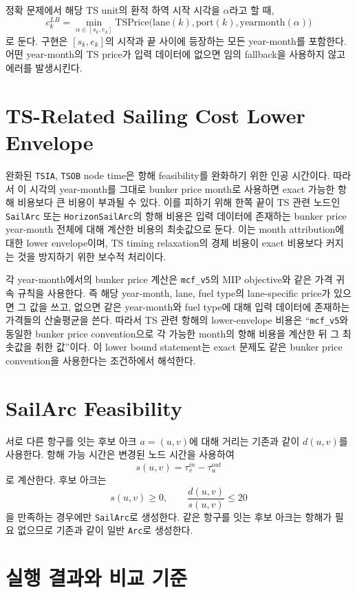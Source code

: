 \documentclass[11pt]{article}
\begin{document}
정확 문제에서 해당 TS unit의 환적 하역 시작 시각을 $\alpha$라고 할 때,
\[
  c^{LB}_k
  =
  \min_{\alpha\in [s_k,e_k]}
  \mathrm{TSPrice}\bigl(\mathrm{lane}(k),\mathrm{port}(k),
  \mathrm{yearmonth}(\alpha)\bigr)
\]
로 둔다. 구현은 $[s_k,e_k]$의 시작과 끝 사이에 등장하는 모든 year-month를 포함한다.
어떤 year-month의 TS price가 입력 데이터에 없으면 임의 fallback을 사용하지 않고
에러를 발생시킨다.

\section{TS-Related Sailing Cost Lower Envelope}

완화된 \texttt{TSIA}, \texttt{TSOB} node time은 항해 feasibility를 완화하기 위한
인공 시간이다. 따라서 이 시각의 year-month를 그대로 bunker price month로 사용하면
exact 가능한 항해 비용보다 큰 비용이 부과될 수 있다. 이를 피하기 위해 한쪽 끝이
TS 관련 노드인 \texttt{SailArc} 또는 \texttt{HorizonSailArc}의 항해 비용은 입력
데이터에 존재하는 bunker price year-month 전체에 대해 계산한 비용의 최솟값으로
둔다. 이는 month attribution에 대한 lower envelope이며, TS timing relaxation의
경제 비용이 exact 비용보다 커지는 것을 방지하기 위한 보수적 처리이다.

각 year-month에서의 bunker price 계산은 \texttt{mcf\_v5}의 MIP objective와 같은
가격 귀속 규칙을 사용한다. 즉 해당 year-month, lane, fuel type의 lane-specific
price가 있으면 그 값을 쓰고, 없으면 같은 year-month와 fuel type에 대해 입력 데이터에
존재하는 가격들의 산술평균을 쓴다. 따라서 TS 관련 항해의 lower-envelope 비용은
``\texttt{mcf\_v5}와 동일한 bunker price convention으로 각 가능한 month의 항해
비용을 계산한 뒤 그 최솟값을 취한 값''이다. 이 lower bound statement는 exact 문제도
같은 bunker price convention을 사용한다는 조건하에서 해석한다.

\section{SailArc Feasibility}

서로 다른 항구를 잇는 후보 아크 $a=(u,v)$에 대해 거리는 기존과 같이
$d(u,v)$를 사용한다. 항해 가능 시간은 변경된 노드 시간을 사용하여
\[
  s(u,v)=\tau^{in}_v-\tau^{out}_u
\]
로 계산한다. 후보 아크는
\[
  s(u,v)\ge 0,\qquad \frac{d(u,v)}{s(u,v)} \le 20
\]
을 만족하는 경우에만 \texttt{SailArc}로 생성한다. 같은 항구를 잇는 후보 아크는
항해가 필요 없으므로 기존과 같이 일반 \texttt{Arc}로 생성한다.

\section{실행 결과와 비교 기준}
\end{document}
